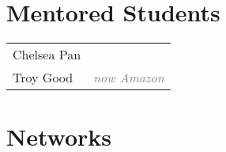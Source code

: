 \documentclass[10pt]{cooperCV2}
\begin{document}
%	

















%	






\section{Mentored Students}
\begin{longtable}{@{} l  l @{}}
 
Chelsea Pan &  \\
 
Troy Good &  \textcolor{gray}{\textit{ now Amazon}}  \\

\end{longtable}






%	






\section{Networks}
\end{document}
